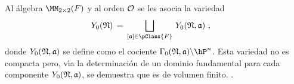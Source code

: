 % 
Al \'{a}lgebra $\MM_{2\times 2}(F)$ y al orden $\cal{O}$ se les asocia la
variedad
\begin{align*}
	Y_{0}(\frak{N}) & \,=\,
		\bigsqcup_{[\frak{a}]\in\pClass{F}}\,
		Y_{0}(\frak{N},\frak{a})
	\text{ ,}
\end{align*}
%
donde $Y_{0}(\frak{N},\frak{a})$ se define como el cociente
$\Gamma_{0}(\frak{N},\frak{a})\backslash\hP^{n}$. Esta variedad no es compacta
pero, v\'{\i}a la determinaci\'{o}n de un dominio fundamental para cada
componente $Y_{0}(\frak{N},\frak{a})$, se demuestra que es de volumen finito.
\cite[Ch.~IV,\S~1]{vanDerGeerSurfaces}.
%
